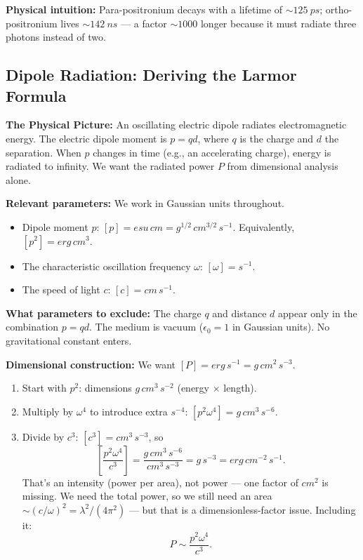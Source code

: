 \noindent\textbf{Physical intuition:} Para-positronium decays with a lifetime of
$\sim \SI{125}{ps}$; ortho-positronium lives $\sim \SI{142}{ns}$ — a factor
$\sim 1000$ longer because it must radiate three photons instead of two.

\subsection{Dipole Radiation: Deriving the Larmor Formula}

\textbf{The Physical Picture:}
An oscillating electric dipole radiates electromagnetic energy.  The
electric dipole moment is $p = qd$, where $q$ is the charge and $d$ the
separation.  When $p$ changes in time (e.g., an accelerating charge), energy
is radiated to infinity.  We want the radiated power $P$ from dimensional
analysis alone.

\textbf{Relevant parameters:}
We work in Gaussian units throughout.
\begin{itemize}
    \item Dipole moment $p$: $[p] = \si{esu\,cm} = \si{g^{1/2}\,cm^{3/2}\,s^{-1}}$.
    Equivalently, $[p^2] = \si{erg\,cm^3}$.
    \item The characteristic oscillation frequency $\omega$: $[\omega] = \si{s^{-1}}$.
    \item The speed of light $c$: $[c] = \si{cm\,s^{-1}}$.
\end{itemize}

\noindent\textbf{What parameters to exclude:} The charge $q$ and distance $d$
appear only in the combination $p = qd$. The medium is vacuum ($\epsilon_0 = 1$
in Gaussian units). No gravitational constant enters.

\textbf{Dimensional construction:}
We want $[P] = \si{erg\,s^{-1}} = \si{g\,cm^2\,s^{-3}}$.

\begin{enumerate}
    \item Start with $p^2$: dimensions $\si{g\,cm^3\,s^{-2}}$
    (energy $\times$ length).
    \item Multiply by $\omega^4$ to introduce extra $\si{s^{-4}}$:
    $[p^2 \omega^4] = \si{g\,cm^3\,s^{-6}}$.
    \item Divide by $c^3$: $[c^3] = \si{cm^3\,s^{-3}}$, so
    \[
        \left[\frac{p^2 \omega^4}{c^3}\right]
        = \frac{\si{g\,cm^3\,s^{-6}}}{\si{cm^3\,s^{-3}}} = \si{g\,s^{-3}}
        = \si{erg\,cm^{-2}\,s^{-1}}.
    \]
    That's an intensity (power per area), not power — one factor of $\si{cm^2}$ is missing.
    We need the total power, so we still need an area $\sim (c/\omega)^2 = \lambda^2/(4\pi^2)$
    — but that is a dimensionless-factor issue.  Including it:
    \[
        P \sim \frac{p^2 \omega^4}{c^3}.
    \]
\end{enumerate}

